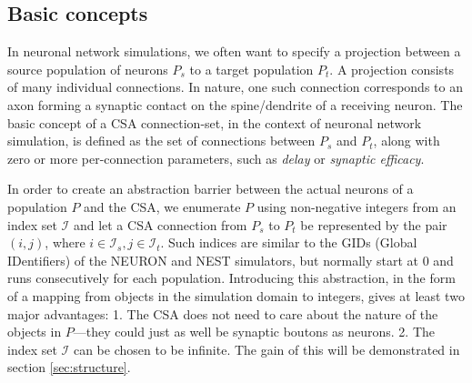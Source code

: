 \documentclass{frontiersSCNS} %
\begin{document}
\subsection{Basic concepts}

In neuronal network simulations, we often want to specify a projection
between a source population of neurons $P_s$ to a target population
$P_t$.  A projection consists of many individual connections.  In
nature, one such connection corresponds to an axon
forming a synaptic contact on
the spine/dendrite of a receiving neuron.  The basic concept of a CSA
connection-set, in the context of neuronal network simulation, is
defined as the set of connections between $P_s$ and $P_t$, along with
zero or more per-connection parameters, such as \emph{delay} or
\emph{synaptic efficacy}.

In order to create an abstraction barrier between the actual neurons
of a population $P$ and the CSA, we enumerate $P$ using non-negative
integers from an index set $\mathcal{I}$ and let a CSA connection from
$P_s$ to $P_t$ be represented by the pair $(i, j)$, where $i \in
\mathcal{I}_s, j \in \mathcal{I}_t$.  Such indices are similar to
the GIDs (Global IDentifiers) of the NEURON and NEST simulators, but
normally start at 0 and runs consecutively for each population.
Introducing this abstraction, in the form of a mapping from objects in
the simulation domain to integers, gives at least two major
advantages: 1. The CSA does not need to care about the nature of the
objects in $P$---they could just as well be synaptic boutons as neurons.
2. The index set $\mathcal{I}$ can be chosen to be infinite.  The
gain of this will be demonstrated in section \ref{sec:structure}.
\end{document}
